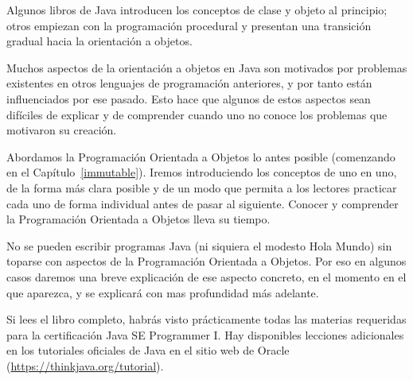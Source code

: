 Algunos libros de Java introducen los conceptos de clase y objeto al principio; otros empiezan con la programación procedural y presentan una transición gradual hacia la orientación a objetos.

Muchos aspectos de la orientación a objetos en Java son motivados por problemas existentes en otros lenguajes de programación anteriores, y por tanto están influenciados por ese pasado.
Esto hace que algunos de estos aspectos sean difíciles de explicar y de comprender cuando uno no conoce los problemas que motivaron su creación.

Abordamos la Programación Orientada a Objetos lo antes posible (comenzando en el Capítulo~\ref{immutable}).
Iremos introduciendo los conceptos de uno en uno, de la forma más clara posible y de un modo que permita a los lectores practicar cada uno de forma individual antes de pasar al siguiente.
Conocer y comprender la Programación Orientada a Objetos lleva su tiempo.

No se pueden escribir programas Java (ni siquiera el modesto Hola Mundo) sin toparse con aspectos de la Programación Orientada a Objetos.
Por eso en algunos casos daremos una breve explicación de ese aspecto concreto, en el momento en el que aparezca, y se explicará con mas profundidad más adelante.

Si lees el libro completo, habrás visto prácticamente todas las materias requeridas para la certificación Java SE Programmer I.
Hay disponibles lecciones adicionales en los tutoriales oficiales de Java en el sitio web de Oracle (\url{https://thinkjava.org/tutorial}).

